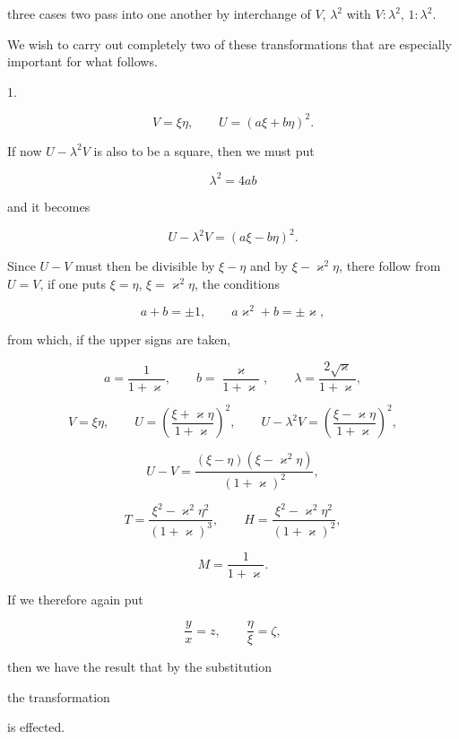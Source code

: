 three cases two pass into one another by interchange of
$V$, $\lambda^2$ with $V:\lambda^2$, $1:\lambda^2$.

We wish to carry out completely two of these transformations that are
especially important for what follows.

\begin{center}
1. 
\end{center}

\[
V = \xi\eta, \qquad U = (a\xi+b\eta)^2.
\]

If now $U - \lambda^2 V$ is also to be a square, then we must put

\[
\lambda^2 = 4ab
\]

and it becomes

\[
U - \lambda^2 V = (a\xi - b\eta)^2.
\]

Since $U-V$ must then be divisible by $\xi-\eta$ and by $\xi-\varkappa^2\eta$,
there follow from $U=V$, if one puts $\xi=\eta$, $\xi=\varkappa^2\eta$, the
conditions

\[
a+b=\pm 1, \qquad a\varkappa^2+b=\pm\varkappa,
\]

from which, if the upper signs are taken,

\[
a=\frac{1}{1+\varkappa}, \qquad b=\frac{\varkappa}{1+\varkappa}, \qquad
\lambda=\frac{2\sqrt{\varkappa}}{1+\varkappa},
\]

\[
V=\xi\eta, \qquad U=\left(\frac{\xi+\varkappa\eta}{1+\varkappa}\right)^2,
\qquad U-\lambda^2V=\left(\frac{\xi-\varkappa\eta}{1+\varkappa}\right)^2,
\]

\[
U-V=\frac{(\xi-\eta)(\xi-\varkappa^2\eta)}{(1+\varkappa)^2},
\]

\[
T=\frac{\xi^2-\varkappa^2\eta^2}{(1+\varkappa)^3}, \qquad
H=\frac{\xi^2-\varkappa^2\eta^2}{(1+\varkappa)^2},
\]

\[
M=\frac{1}{1+\varkappa}.
\]

If we therefore again put

\[
\frac{y}{x}=z, \qquad \frac{\eta}{\xi}=\zeta,
\]

then we have the result that by the substitution


the transformation


is effected.
